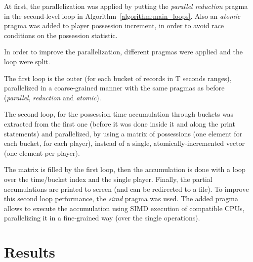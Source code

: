 \documentclass[a4paper, 10pt]{article}
\begin{document}
At first, the parallelization was applied by putting the \emph{parallel reduction} pragma in the second-level loop in Algorithm~\ref{algorithm:main_loops}.
Also an \emph{atomic} pragma was added to player possession increment, in order to avoid race conditions on the possession statistic.

In order to improve the parallelization, different pragmas were applied and the loop were split.

The first loop is the outer (for each bucket of records in T seconds ranges), parallelized in a coarse-grained manner with the same pragmas as before (\emph{parallel}, \emph{reduction} and \emph{atomic}).

The second loop, for the possession time accumulation through buckets was extracted from the first one (before it was done inside it and along the print statements) and parallelized, by using a matrix of possessions (one element for each bucket, for each player), instead of a single, atomically-incremented vector (one element per player).

The matrix is filled by the first loop, then the accumulation is done with a loop over the time/bucket index and the single player.
Finally, the partial accumulations are printed to screen (and can be redirected to a file).
To improve this second loop performance, the \emph{simd} pragma was used.
The added pragma allows to execute the accumulation using SIMD execution of compatible CPUs, parallelizing it in a fine-grained way (over the single operations).

\section*{Results}
\end{document}
